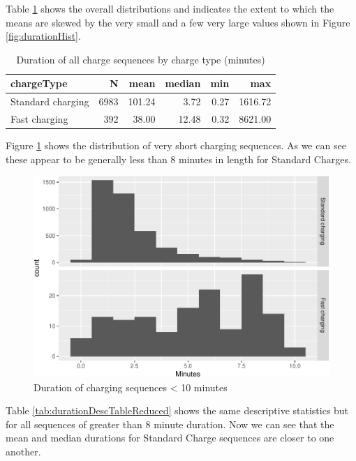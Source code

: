\documentclass[]{article}
\begin{document}
Table \ref{tab:durationDescTable} shows the overall distributions and
indicates the extent to which the means are skewed by the very small and
a few very large values shown in Figure \ref{fig:durationHist}.

\begin{table}[t]

\caption{\label{tab:durationDescTable}Duration of all charge sequences by charge type (minutes)}
\centering
\begin{tabular}{l|r|r|r|r|r}
\hline
chargeType & N & mean & median & min & max\\
\hline
Standard charging & 6983 & 101.24 & 3.72 & 0.27 & 1616.72\\
\hline
Fast charging & 392 & 38.00 & 12.48 & 0.32 & 8621.00\\
\hline
\end{tabular}
\end{table}

Figure \ref{fig:shortDuration} shows the distribution of very short
charging sequences. As we can see these appear to be generally less than
8 minutes in length for Standard Charges.

\begin{figure}
\centering
\includegraphics{EVBB_report_files/figure-latex/shortDuration-1.pdf}
\caption{\label{fig:shortDuration}Duration of charging sequences \textless{}
10 minutes}
\end{figure}

Table \ref{tab:durationDescTableReduced} shows the same descriptive
statistics but for all sequences of greater than 8 minute duration. Now
we can see that the mean and median durations for Standard Charge
sequences are closer to one another.
\end{document}
